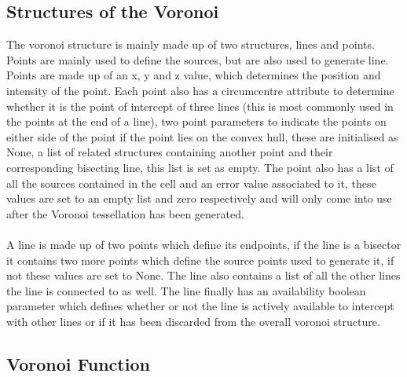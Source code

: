 \subsection{Structures of the Voronoi}
The voronoi structure is mainly made up of two structures, lines and points. Points are mainly used to define the sources, but are also used to generate line. Points are made up of an x, y and z value, which determines the position and intensity of the point. Each point also has a circumcentre attribute to determine whether it is the point of intercept of three lines (this is most commonly used in the points at the end of a line), two point parameters to indicate the points on either side of the point if the point lies on the convex hull, these are initialised as None, a list of related structures containing another point and their corresponding bisecting line, this list is set as empty. The point also has a list of all the sources contained in the cell and an error value associated to it, these values are set to an empty list and zero respectively and will only come into use after the Voronoi tessellation has been generated.
\\
\\
A line is made up of two points which define its endpoints, if the line is a bisector it contains two more points which define the source points used to generate it, if not these values are set to None. The line also contains a list of all the other lines the line is connected to as well. The line finally has an availability boolean parameter which defines whether or not the line is actively available to intercept with other lines or if it has been discarded from the overall voronoi structure.

\subsection{Voronoi Function}

